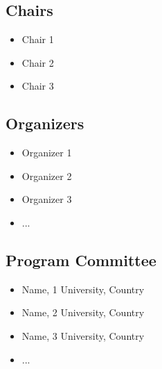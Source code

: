 \documentclass[
]{ceurart}
\begin{document}
\subsection*{Chairs}
\begin{itemize}
  \item Chair 1
  \item Chair 2
  \item Chair 3
\end{itemize}

\subsection*{Organizers}
\begin{itemize}
  \item Organizer 1
  \item Organizer 2
  \item Organizer 3
  \item ...
\end{itemize}

\subsection*{Program Committee}
\begin{itemize}
  \item Name, 1 University, Country
  \item Name, 2 University, Country
  \item Name, 3 University, Country
  \item ...
\end{itemize}
\end{document}
